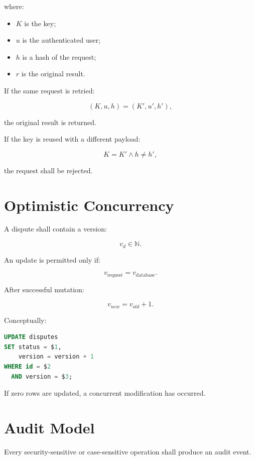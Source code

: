 \documentclass[11pt,a4paper]{article}
\begin{document}
where:

\begin{itemize}
    \item \(K\) is the key;
    \item \(u\) is the authenticated user;
    \item \(h\) is a hash of the request;
    \item \(r\) is the original result.
\end{itemize}

If the same request is retried:

\[
(K,u,h)=(K',u',h'),
\]

the original result is returned.

If the key is reused with a different payload:

\[
K=K'
\land
h\neq h',
\]

the request shall be rejected.

\section{Optimistic Concurrency}

A dispute shall contain a version:

\[
v_d \in \mathbb{N}.
\]

An update is permitted only if:

\[
v_{\text{request}}
=
v_{\text{database}}.
\]

After successful mutation:

\[
v_{new}=v_{old}+1.
\]

Conceptually:

\begin{lstlisting}[language=SQL]
UPDATE disputes
SET status = $1,
    version = version + 1
WHERE id = $2
  AND version = $3;
\end{lstlisting}

If zero rows are updated, a concurrent modification has occurred.

\section{Audit Model}

Every security-sensitive or case-sensitive operation shall produce an
audit event.
\end{document}
